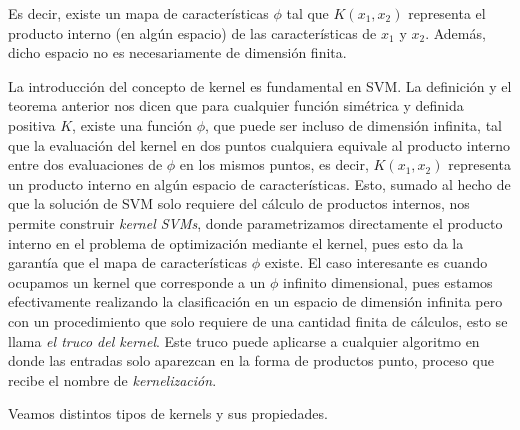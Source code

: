 Es decir, existe un mapa de características $\phi$ tal que $K(x_1, x_2)$ representa el producto interno (en algún espacio) de las características de $x_1$ y $x_2$. Además, dicho espacio no es necesariamente de dimensión finita.

\begin{remark}
La introducción del concepto de kernel es fundamental en SVM. La definición y el teorema anterior nos dicen que para cualquier función simétrica y definida positiva $K$, existe una función $\phi$, que puede ser incluso de dimensión infinita, tal que la evaluación del kernel en dos puntos cualquiera equivale al producto interno entre dos evaluaciones de $\phi$ en los mismos puntos, es decir, $K(x_1,x_2)$ representa un producto interno en algún espacio de características. Esto, sumado al hecho de que la solución de SVM solo requiere del cálculo de productos internos, nos permite construir \emph{kernel SVMs}, donde parametrizamos directamente el producto interno en el problema de optimización mediante el kernel, pues esto da la garantía que el mapa de características $\phi$ existe. El caso interesante es cuando ocupamos un kernel que corresponde a un $\phi$ infinito dimensional, pues estamos efectivamente realizando la clasificación en un espacio de dimensión infinita pero con un procedimiento que solo requiere de una cantidad finita de cálculos, esto se llama \emph{el truco del kernel}. Este truco puede aplicarse a cualquier algoritmo en donde las entradas solo aparezcan en la forma de productos punto, proceso que recibe el nombre de \emph{kernelización}. 
\end{remark}

\newpage

 Veamos distintos tipos de kernels y sus propiedades.


